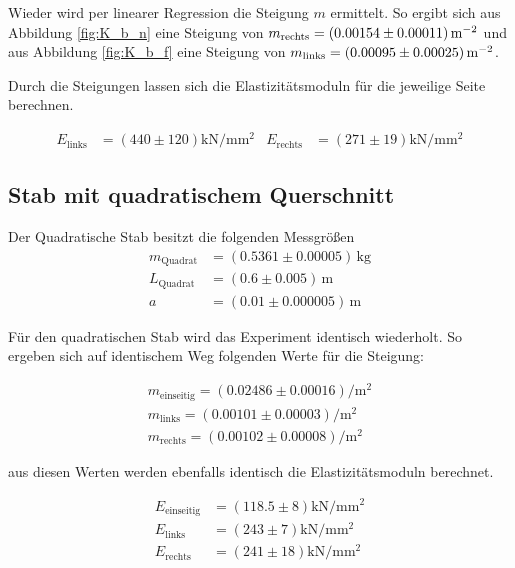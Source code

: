 \noindent Wieder wird per linearer Regression die Steigung $m$ ermittelt. So ergibt sich aus Abbildung \ref{fig:K_b_n} eine Steigung
von $m_\text{rechts}= \left( 0.00154 \pm 0.00011\right) \unit[per-mode=reciprocal]{\per \meter \squared} $ und aus Abbildung \ref{fig:K_b_f} eine Steigung von 
$m_\text{links}= \left( 0.00095\pm0.00025 \right) \unit[per-mode=reciprocal]{\per \meter \squared}$.

\noindent Durch die Steigungen lassen sich die Elastizitätsmoduln für die jeweilige Seite berechnen.

\begin{align}
    E_\text{links} & = \left( 440 \pm 120\right) \unit{\kilo \newton \per \milli \meter \squared} &
    E_\text{rechts} & = \left(271 \pm 19\right) \unit{\kilo \newton \per \milli \meter \squared}
\end{align}


\subsection{Stab mit quadratischem Querschnitt}
Der Quadratische Stab besitzt die folgenden Messgrößen
\begin{align*}
    m_\text{Quadrat} &= \left(0.5361 \pm 0.00005 \right)\,\unit{\kilo \gram} \\
    L_\text{Quadrat} &= \left(0.6 \pm 0.005 \right)\,\unit{\meter}\\
    a &= \left(0.01 \pm 0.000005\right) \, \unit{\meter}
\end{align*}

\noindent Für den quadratischen Stab wird das Experiment identisch wiederholt. 
So ergeben sich auf identischem Weg folgenden Werte für die Steigung:

\begin{align}
    m_\text{einseitig} = \left(0.02486 \pm 0.00016\right)\unit{\per \meter \squared}  \\
    m_\text{links} = \left(0.00101\pm0.00003\right)\unit{\per \meter \squared}        \\
    m_\text{rechts} = \left(0.00102\pm0.00008\right)\unit{\per \meter \squared}
\end{align}

\noindent aus diesen Werten werden ebenfalls identisch die Elastizitätsmoduln berechnet.

\begin{align}
    E_\text{einseitig} &=\left(118.5   \pm 8\right)\unit{\kilo \newton \per \milli \meter \squared}    \\
    E_\text{links} &=    \left(243    \pm 7 \right)\unit{\kilo \newton \per \milli \meter \squared}     \\
    E_\text{rechts} &=   \left(241    \pm 18\right)\unit{\kilo \newton \per \milli \meter \squared}    
\end{align}


